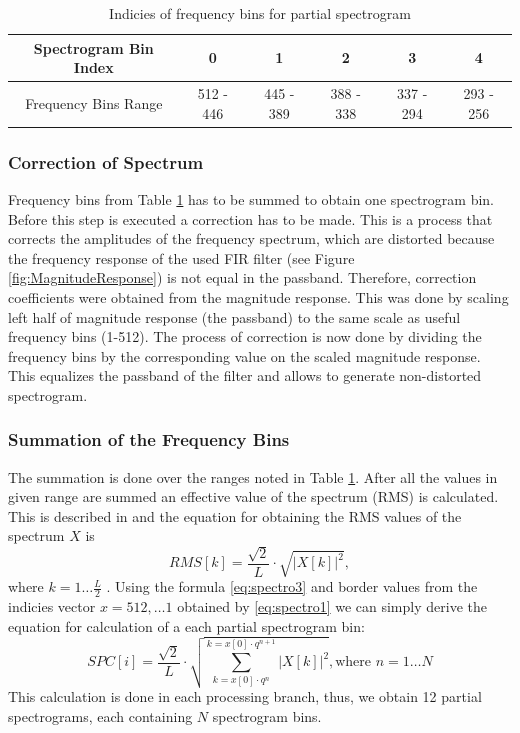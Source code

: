 \documentclass[twoside]{ctuthesis}
\theoremstyle{plain}
\theoremstyle{definition}
\theoremstyle{note}
\begin{document}
\begin{table}[htbp]
	\centering
	\caption{Indicies of frequency bins for partial spectrogram}
	\begin{tabular}{cccccc}
		\toprule
		Spectrogram Bin Index & 0 & 1 & 2 & 3 & 4 \\
		\midrule
		Frequency Bins Range  & 512 - 446  & 445 - 389 & 388 - 338 & 337 - 294 & 293 - 256  \\
		\bottomrule
	\end{tabular}%
	\label{tab:indiciesBins}%
\end{table}%

\subsubsection{Correction of Spectrum}
Frequency bins from Table \ref{tab:indiciesBins} has to be summed to obtain one spectrogram bin. Before this step is executed a correction has to be made. This is a process that corrects the amplitudes of the frequency spectrum, which are distorted because the frequency response of the used FIR filter (see Figure \ref{fig:MagnitudeResponse}) is not equal in the passband. Therefore, correction coefficients were obtained from the magnitude response. This was done by scaling left half of magnitude response (the passband) to the same scale as useful frequency bins (1-512). The process of correction is now done by dividing the frequency bins by the corresponding value on the scaled magnitude response. This equalizes the passband of the filter and allows to generate non-distorted spectrogram.

\subsubsection{Summation of the Frequency Bins}
The summation is done over the ranges noted in Table \ref{tab:indiciesBins}. After all the values in given range are summed an effective value of the spectrum (RMS) is calculated. This is described in \cite{cite:1} and the equation for obtaining the RMS values of the spectrum $X$ is  
\begin{equation} \label{eq:spectro3}
	RMS[k]=\frac{\sqrt{2}}{L}\cdot \sqrt{|X[k]|^2},
\end{equation}
where $k=1\ldots \frac{L}{2}$ \cite{cite:1}.
Using the formula \ref{eq:spectro3} and border values from the indicies vector $x=512,\ldots1$ obtained by \ref{eq:spectro1} we can simply derive the equation for calculation of a each partial spectrogram bin:
\begin{equation} \label{eq:spectro4}
	SPC[i]=\frac{\sqrt{2}}{L}\cdot \sqrt{\sum_{k=x[0]\cdot q^n}^{k=x[0]\cdot q^{n+1}}|X[k]|^2}, \text{where }n=1\ldots N
\end{equation}
This calculation is done in each processing branch, thus, we obtain 12 partial spectrograms, each containing $N$ spectrogram bins.
\end{document}

